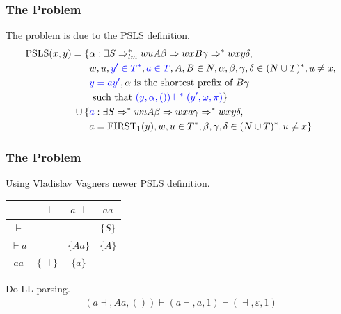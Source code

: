 \documentclass[t,24pt]{beamer}
\begin{document}
\begin{frame}[hvid]
    \frametitle{The Problem}
    The problem is due to the PSLS definition.
    {\footnotesize
        \begin{align*}
            \text{PSLS}(x, y) = \{ & \alpha : \exists S \Rightarrow^*_{lm} wuA\beta \Rightarrow wxB\gamma \Rightarrow^* wxy\delta, \\
            & w, u, {\color{blue} y' \in T^*}, {\color{blue} a \in T}, A, B \in N, \alpha, \beta, \gamma, \delta \in (N \cup T)^*, u \neq x, \\
            & {\color{blue} y = ay'}, \alpha \text{ is the shortest prefix of } B\gamma \\ 
            & \text{ such that } {\color{blue} (y, \alpha, ()) \vdash^* (y', \omega, \pi)}\} \\
            \cup \: \{ &  {\color{blue} a} : \exists S \Rightarrow^* wuA\beta \Rightarrow wxa\gamma \Rightarrow^* wxy\delta, \\
            & a = \text{FIRST}_1(y), w,u \in T^*, \beta, \gamma, \delta \in (N \cup T)^*, u \neq x \}
        \end{align*}
    }
\end{frame}

\begin{frame}[hvid]
    \frametitle{The Problem}
    Using Vladislav Vagners newer PSLS definition.
    \begin{center}
        \begin{tabular}{c|c|c|c}
            & $\dashv$ & $a\dashv$ & $aa$ \\ \hline
            $\vdash$ & & & $\{S\}$ \\\hline
            $\vdash a$ & & $\{Aa\}$ & $\{A\}$ \\\hline
            $aa$ & $\{\dashv\}$ & $\{a\}$ & 
        \end{tabular}
    \end{center}
    Do LL parsing.
    \begin{align*}
        (a \dashv, Aa, ()) \vdash (a \dashv, a, 1) \vdash (\dashv, \varepsilon, 1)
    \end{align*}
\end{frame}
\end{document}
